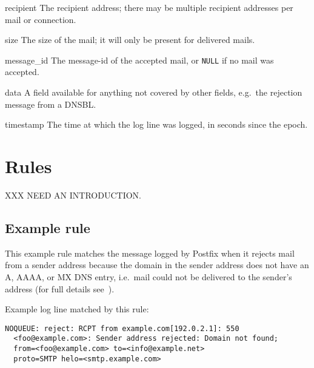 \begin{eqlist}
    \item [recipient] The recipient address; there may be multiple
        recipient addresses per mail or connection.

    \item [size] The size of the mail; it will only be present for
        delivered mails.

    \item [message\_id] The message-id of the accepted mail, or
        \texttt{NULL} if no mail was accepted.

    \item [data] A field available for anything not covered by other
        fields, e.g.\ the rejection message from a \gls{DNSBL}\@.

    \item [timestamp] The time at which the log line was logged, in seconds
        since the epoch.

\end{eqlist}



\section{Rules}

\label{rules}

XXX NEED AN INTRODUCTION\@.

\subsection{Example rule}

\label{example rule}

This example rule matches the message logged by Postfix when it rejects
mail from a sender address because the domain in the sender address does
not have an A, AAAA, or MX DNS entry, i.e.\ mail could not be delivered
to the sender's address (for full details
see~\cite{reject-unknown-sender-domain}).

Example log line matched by this rule:


\begin{verbatim}
NOQUEUE: reject: RCPT from example.com[192.0.2.1]: 550
  <foo@example.com>: Sender address rejected: Domain not found;
  from=<foo@example.com> to=<info@example.net>
  proto=SMTP helo=<smtp.example.com>
\end{verbatim}


